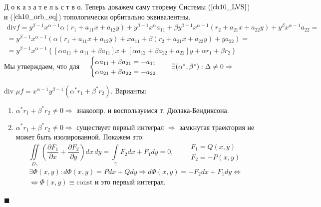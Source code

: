 \documentclass[oneside, final, 12pt]{article}
\theoremstyle{def}
\theoremstyle{th}
\theoremstyle{rem}
\renewenvironment{proof}{\par Д о к а з а т е л ь с т в о.}{\hfill$\blacksquare$}
\numberwithin{figure}{section}
\numberwithin{equation}{section}
\begin{document}
\begin{proof}{ Теперь докажем саму теорему}
		Системы ($\ref{ch10_LVS}$) и ($\ref{ch10_orb_eq}$) топологически орбитально эквивалентны. 
		$$
		\begin{gathered}
			\textrm{div} f = y^{\beta-1} x^{\alpha-1}\alpha(r_1 + a_{11}x + a_{12}y) + 
										y^{\beta -1} x^{\alpha}a_{11} +
										\beta y^{\beta -1} x^{\alpha-1}(r_2 + a_{21}x + a_{22}y) + 
										y^{\beta} x^{\alpha-1} a_{22} = \\
			= y^{\beta-1} x^{\alpha-1} (\alpha (r_1 + a_{11}x + a_{12}y) 
							+ x a_{11} +\beta (r_2 + a_{21}x + a_{22}y) + y a_{22}) = \\
			= y^{\beta-1} x^{\alpha-1} \left\{ [\alpha a_{11}+ a_{11}+\beta a_{11} ]x +
								[\alpha a_{12} + \beta a_{22} + a_{22}]y + \alpha r_1+ \beta r_2 \right\}
		\end{gathered}
		$$
		Мы утверждаем, что для $\quad \begin{cases}
													\alpha a_{11} + \beta a_{21} = -a_{11} \\
													\alpha a_{21} + \beta a_{22} = -a_{22}
												\end{cases} \quad \exists(\alpha^*, \beta^*): \Delta \neq 0 \Rightarrow \quad
												\vspace{2mm}$\newline
												
		\textrm{div} $\mu f = x^{\alpha-1}y^{\beta -1}(\alpha^* r_1 + \beta^* r_2) $. Варианты:
		\begin{enumerate}
			\item $\alpha^* r_1 + \beta^* r_2 \neq 0 \Rightarrow$ знакоопр. и воспользуемся т. Дюлака-Бендиксона.
			\item $\alpha^* r_1 + \beta^* r_2 \neq 0 \Rightarrow$ существует первый интеграл $\Rightarrow$
					замкнутая траектория \newline не может быть изолированной. Покажем это:
					$$
						\iint\limits_{D_\gamma}\left( \dfrac{\partial F_1}{\partial x} + 
																		\dfrac{\partial F_2}{\partial y} \right)dx\,dy = 
						\int\limits_{\gamma} F_2 dx + F_1 dy = 0, \qquad 
						\begin{gathered}
							F_1 = Q(x,y)\\
							F_2 = -P(x,y)
						\end{gathered}
					$$
					$$
						\begin{gathered}
						\exists \Phi(x,y): d\Phi(x,y) = Pdx+Qdy \Rightarrow d\Phi(x,y) = -F_2dx+F_1dy \Leftrightarrow \\
							 \Leftrightarrow \Phi(x,y) \equiv \textrm{const} \text{ и это первый интеграл.}
						\end{gathered}
					$$
		\end{enumerate}
	\end{proof}
\end{document}
